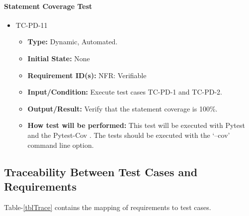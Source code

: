\documentclass[12pt, titlepage]{article}
\begin{document}
\paragraph{Statement Coverage Test}

\begin{itemize}
\item{TC-PD-11\\}
\begin{itemize}

\item{\textbf{Type:}} Dynamic, Automated.
					
\item{\textbf{Initial State:}} None

\item{\textbf{Requirement ID(s):}} NFR: Verifiable
					
\item{\textbf{Input/Condition:}}  Execute test cases TC-PD-1 and TC-PD-2.
					
\item{\textbf{Output/Result:}} Verify that the statement coverage is 100\%.

\item{\textbf{How test will be performed:}}  This test will be executed with Pytest \cite{Pytest} and 
the Pytest-Cov \cite{PyTest-Cov}. The tests should be executed with the `--cov' command line option.

\end{itemize}
\end{itemize}



\subsection{Traceability Between Test Cases and Requirements}


Table-\ref{tblTrace} contains the mapping of requirements to test cases.
  
\end{document}
